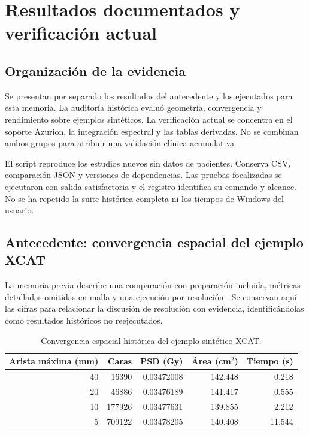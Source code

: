 \chapter{Resultados documentados y verificación actual}
\section{Organización de la evidencia}
Se presentan por separado los resultados del antecedente y los ejecutados para esta memoria. La auditoría histórica evaluó geometría, convergencia y rendimiento sobre ejemplos sintéticos. La verificación actual se concentra en el soporte Azurion, la integración espectral y las tablas derivadas. No se combinan ambos grupos para atribuir una validación clínica acumulativa.

El script  reproduce los estudios nuevos sin datos de pacientes. Conserva CSV, comparación JSON y versiones de dependencias. Las pruebas focalizadas se ejecutaron con salida satisfactoria y el registro identifica su comando y alcance. No se ha repetido la suite histórica completa ni los tiempos de Windows del usuario.

\section{Antecedente: convergencia espacial del ejemplo XCAT}
La memoria previa describe una comparación con preparación incluida, métricas detalladas omitidas en malla y una ejecución por resolución \citep{memoria2026}. Se conservan aquí las cifras para relacionar la discusión de resolución con evidencia, identificándolas como resultados históricos no reejecutados.
\begin{table}[htbp]\centering
\caption{Convergencia espacial histórica del ejemplo sintético XCAT.}
\begin{tabular}{rrrrr}\toprule
Arista máxima (mm) & Caras & PSD (Gy) & Área (cm$^2$) & Tiempo (s)\\\midrule
40 & \num{16390} & \num{0.03472008} & \num{142.448} & \num{0.218}\\
20 & \num{46886} & \num{0.03476189} & \num{141.417} & \num{0.555}\\
10 & \num{177926} & \num{0.03477631} & \num{139.855} & \num{2.212}\\
5 & \num{709122} & \num{0.03478205} & \num{140.408} & \num{11.544}\\\bottomrule
\end{tabular}
\end{table}

